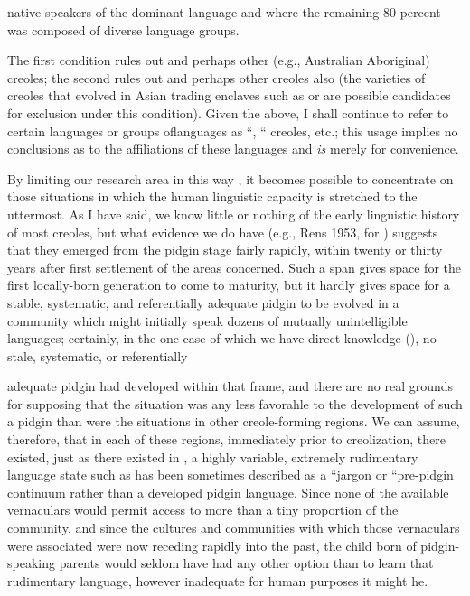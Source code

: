 native speakers of the dominant language and where the remaining 80 percent was composed of diverse language groups.

The first condition rules out  and perhaps other (e.g., Austra\-lian Aboriginal) creoles; the second rules out  and perhaps other creoles also (the varieties of  creoles that evolved in Asian trading enclaves such as  or  are possible candidates for exclusion under this condition). Given the above, I shall continue to refer to certain languages or groups oflanguages as ``,{\textquotedbl} `` creoles, etc.; this usage implies no conclusions as to the affiliations of these languages and \textit{is} merely for convenience.

By limiting our research area in this way , it becomes possible to concentrate on those situations in which the human linguistic capacity is stretched to the uttermost. As I have said, we know little or nothing of the early linguistic history of most creoles, but what evidence we do have (e.g., Rens 1953, for ) suggests that they emerged from the pidgin stage fairly rapidly, within twenty or thirty years after first settlement of the areas concerned. Such a  span gives space for the first locally-born generation to come to maturity, but it hardly gives space for a stable, systematic, and referentially adequate pidgin to be evolved in a community which might initially speak dozens of mutually unintelligible languages; certainly, in the one case of which we have direct knowledge (), no stale, systematic, or referentially


adequate pidgin had developed within that  frame, and there are no real grounds for supposing that the  situation was any less favorahle to the development of such a pidgin than were the situations in other creole-forming regions. We can assume, therefore, that in each of these regions, immediately prior to creolization, there existed, just as there existed in , a highly variable, extremely rudimentary language state such as has been sometimes described as a ``jargon or ``pre-pidgin continuum rather than a developed pidgin language. Since none of the available vernaculars would permit access to more than a tiny proportion of the community, and since the cultures and communities with which those vernaculars were associated were now receding rapidly into the past, the child born of pidgin-speaking parents would seldom have had any other option than to learn that rudi\-mentary language, however inadequate for human purposes it might he.

